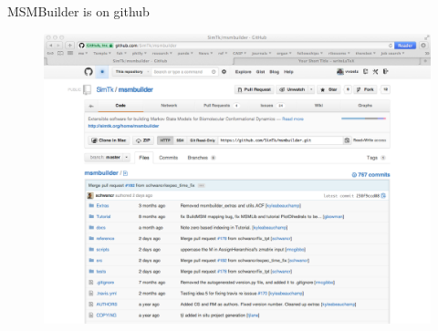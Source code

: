 \documentclass{beamer}
\begin{document}
\begin{frame}{MSMBuilder is on github}

\begin{figure}
\includegraphics[width=1.0\textwidth]{github}
\end{figure}

\end{frame}
\end{document}
